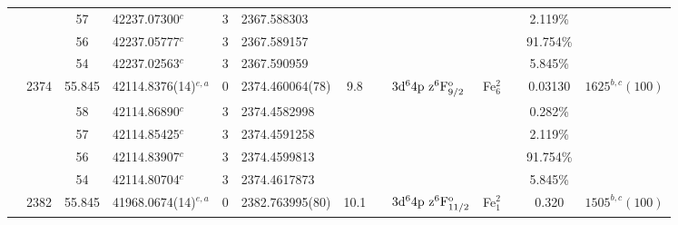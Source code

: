 \begin{table*}
\begin{center}
{\begin{tabular}{:l;l;c;l;c;l;c;l;l;c;c;c;c}
\rowstyle{\itshape}               &        & 57        & 42237.07300$^{c}$                & 3 &   2367.588303      &      & $                                        $ & $                                        $ &             &              & 2.119\%   & $     ^{}     $\\
\rowstyle{\itshape}               &        & 56        & 42237.05777$^{c}$                & 3 &   2367.589157      &      & $                                        $ & $                                        $ &             &              & 91.754\%  & $     ^{}     $\\
\rowstyle{\itshape}               &        & 54        & 42237.02563$^{c}$                & 3 &   2367.590959      &      & $                                        $ & $                                        $ &             &              & 5.845\%   & $     ^{}     $\\
                                  & 2374   & 55.845    & 42114.8376(14)$^{e,a}$           & 0 &   2374.460064(78)  &  9.8 & $                                        $ & $3\rm{d}^64\rm{p~z}^6\rm{F}_{9/2}^{\rm o}$ & Fe$^2_{6}$  &              & 0.03130   & $ 1625^{b,c}(100)$\\
\rowstyle{\itshape}               &        & 58        & 42114.86890$^{c}$                & 3 &  2374.4582998      &      & $                                        $ & $                                        $ &             &              & 0.282\%   & $     ^{}     $\\
\rowstyle{\itshape}               &        & 57        & 42114.85425$^{c}$                & 3 &  2374.4591258      &      & $                                        $ & $                                        $ &             &              & 2.119\%   & $     ^{}     $\\
\rowstyle{\itshape}               &        & 56        & 42114.83907$^{c}$                & 3 &  2374.4599813      &      & $                                        $ & $                                        $ &             &              & 91.754\%  & $     ^{}     $\\
\rowstyle{\itshape}               &        & 54        & 42114.80704$^{c}$                & 3 &  2374.4617873      &      & $                                        $ & $                                        $ &             &              & 5.845\%   & $     ^{}     $\\
                                  & 2382   & 55.845    & 41968.0674(14)$^{e,a}$           & 0 &   2382.763995(80)  & 10.1 & $                                        $ & $3\rm{d}^64\rm{p~z}^6\rm{F}_{11/2}^{\rm o}$ & Fe$^2_{1}$  &              & 0.320     & $ 1505^{b,c}(100)$\\

\end{tabular}}
\end{center}
\end{table*}
